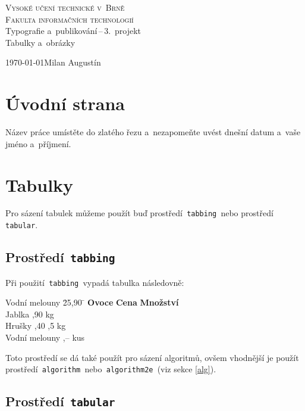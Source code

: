 \documentclass[a4paper, 11pt]{article}
\begin{document}
\begin{titlepage}
\begin{center}
\textsc{{\Huge Vysoké učení technické v~Brně}\\{\huge Fakulta informačních technologií\\}}
{\LARGE Typografie a~publikování\,--\,3.~projekt\verb|  |\\[2mm]
\Huge Tabulky a~obrázky}
\end{center}
{\Large \today \hfill Milan Augustín}
\end{titlepage}

\section{Úvodní strana}

Název práce umístěte do zlatého řezu a~nezapomeňte uvést dnešní datum a~vaše jméno a~příjmení.

\section{Tabulky}

Pro sázení tabulek můžeme použít buď prostředí\texttt{ tabbing }nebo prostředí\texttt{ tabular}.

\subsection{Prostředí\texttt{ tabbing }}

Při použití\texttt{ tabbing }vypadá tabulka následovně:
\begin{tabbing}
Vodní melouny \quad \= 25,90 \quad \= \kill
\textbf{Ovoce} \>\textbf{Cena} \>\textbf{Množství} \\
Jablka ,90  kg \\
Hrušky ,40 ,5 kg \\
Vodní melouny ,--  kus \\
\end{tabbing}

\noindent Toto prostředí se dá také použít pro sázení algoritmů, ovšem vhodnější je použít 
prostředí\texttt{ algorithm }nebo\texttt{ algorithm2e }(viz sekce \ref{alg}).

\subsection{Prostředí\texttt{ tabular }}
\end{document}
